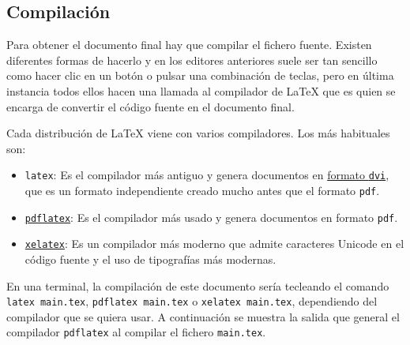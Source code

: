 \documentclass[
  spanish,
  a4paper,
]{scrreport}
\providecommand{\tightlist}{%
  \setlength{\itemsep}{0pt}\setlength{\parskip}{0pt}}
\theoremstyle{definition}
\theoremstyle{remark}
\begin{document}
\subsection{Compilación}\label{compilaciuxf3n}

Para obtener el documento final hay que compilar el fichero fuente.
Existen diferentes formas de hacerlo y en los editores anteriores suele
ser tan sencillo como hacer clic en un botón o pulsar una combinación de
teclas, pero en última instancia todos ellos hacen una llamada al
compilador de LaTeX que es quien se encarga de convertir el código
fuente en el documento final.

Cada distribución de LaTeX viene con varios compiladores. Los más
habituales son:

\begin{itemize}
\tightlist
\item
  \texttt{latex}: Es el compilador más antiguo y genera documentos en
  \href{https://es.wikipedia.org/wiki/DVI_(TeX)}{formato \texttt{dvi}},
  que es un formato independiente creado mucho antes que el formato
  \texttt{pdf}.
\item
  \href{https://www.tug.org/applications/pdftex/}{\texttt{pdflatex}}: Es
  el compilador más usado y genera documentos en formato \texttt{pdf}.
\item
  \href{https://tug.org/xetex/}{\texttt{xelatex}}: Es un compilador más
  moderno que admite caracteres Unicode en el código fuente y el uso de
  tipografías más modernas.
\end{itemize}

En una terminal, la compilación de este documento sería tecleando el
comando \texttt{latex\ main.tex}, \texttt{pdflatex\ main.tex} o
\texttt{xelatex\ main.tex}, dependiendo del compilador que se quiera
usar. A continuación se muestra la salida que general el compilador
\texttt{pdflatex} al compilar el fichero \texttt{main.tex}.
\end{document}

